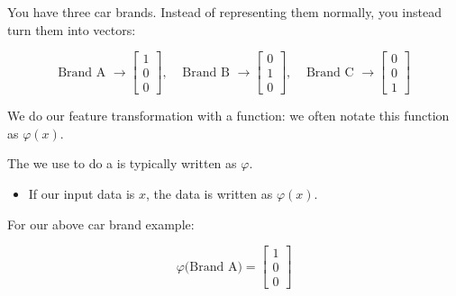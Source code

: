         \miniex You have three car brands. Instead of representing them normally, you instead turn them into vectors: 
        
        \begin{equation}
            \text{Brand A } \to
            \begin{bmatrix}
              1 \\ 0 \\ 0
            \end{bmatrix},
            \;\;\;\;
            \text{Brand B } \to
            \begin{bmatrix}
              0 \\ 1 \\ 0
            \end{bmatrix},
            \;\;\;\;
            \text{Brand C } \to
            \begin{bmatrix}
              0 \\ 0 \\ 1
            \end{bmatrix}
        \end{equation}
        
        We do our feature transformation with a function: we often notate this function as $\varphi(x)$.\\

        \begin{notation}
            The  we use to do a  is typically written as $\varphi$.

            \begin{itemize}
                \item If our input data is $x$, the  data is written as $\varphi(x)$.
            \end{itemize}
        \end{notation}

        \miniex For our above car brand example:

        \begin{equation}
            \varphi\Big(\text{Brand A}\Big) = \begin{bmatrix}
                1 \\ 0 \\ 0
            \end{bmatrix}
        \end{equation}


